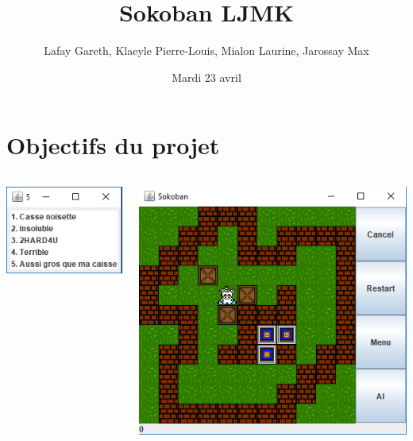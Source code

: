 \documentclass{beamer}
\title{Sokoban LJMK}
\date{Mardi 23 avril}
\author[Lafay Gareth, Klaeyle Pierre-Louis, Mialon Laurine, Jarossay Max] {Lafay Gareth, Klaeyle Pierre-Louis, Mialon Laurine, Jarossay Max}
\institute[Université de Caen Normandie]{Université de Caen Normandie}
\begin{document}
\maketitle
\frame{\tableofcontents} 

\section{Objectifs du projet}

\begin{frame} 

\begin{columns}
\begin{column}{4cm}
  \includegraphics[scale=0.8]{MenuSoko.PNG}
\end{column}
\begin{column}{4cm}
  \includegraphics[scale=0.4]{JeuSoko.PNG}
\end{column}
\end{columns}

\end{frame}
\end{document}
